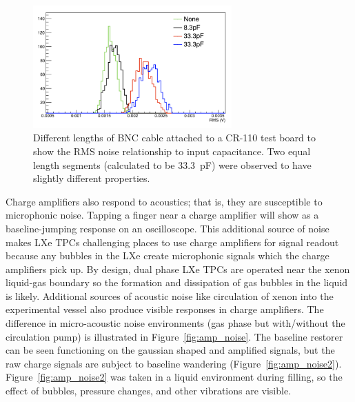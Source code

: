 \begin{figure}[htbp]
\begin{center}
\includegraphics[width=3in]{figures/testbed/rms.png}
\caption{Different lengths of BNC cable attached to a CR-110 test board to show the RMS noise relationship to input capacitance. Two equal length segments (calculated to be 33.3~pF) were observed to have slightly different properties.}
\label{fig:rms}
\end{center}
\end{figure}

Charge amplifiers also respond to acoustics; that is, they are susceptible to microphonic noise. Tapping a finger near a charge amplifier will show as a baseline-jumping response on an oscilloscope. This additional source of noise makes \ac{LXe} \ac{TPC}s challenging places to use charge amplifiers for signal readout because any bubbles in the \ac{LXe} create microphonic signals which the charge amplifiers pick up. By design, dual phase \ac{LXe} \ac{TPC}s are operated near the xenon liquid-gas boundary so the formation and dissipation of gas bubbles in the liquid is likely. Additional sources of acoustic noise like circulation of xenon into the experimental vessel also produce visible responses in charge amplifiers. The difference in micro-acoustic noise environments (gas phase but with/without the circulation pump) is illustrated in Figure~\ref{fig:amp_noise}. The baseline restorer can be seen functioning on the gaussian shaped and amplified signals, but the raw charge signals are subject to baseline wandering (Figure~\ref{fig:amp_noise2}). Figure~\ref{fig:amp_noise2} was taken in a liquid environment during filling, so the effect of bubbles, pressure changes, and other vibrations are visible. 

